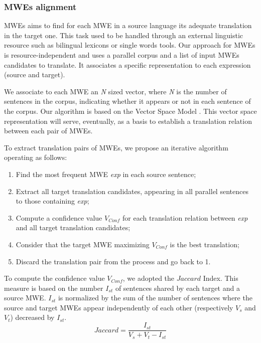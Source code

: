 \documentclass[output=paper,modfonts,nonflat]{langsci/langscibook}
\begin{document}
\subsubsection{MWEs alignment}
MWEs  aims to find for each MWE in a source language its adequate translation in the target one. 
This task used to be handled through an external linguistic resource such as bilingual lexicons or single words  tools. Our approach for MWEs  is resource-independent and uses a parallel corpus and a list of input MWEs candidates to translate. It associates a specific representation to each expression (source and target). 

We associate to each MWE an \textit{N} sized vector, where \textit{N} is the number of sentences in the corpus, indicating whether it appears or not in each sentence of the corpus. 
Our algorithm is based on the Vector Space Model \citep{salton1975vector}.
This vector space representation will serve, eventually, as a basis to establish a translation relation between each pair of MWEs. 
 
To extract translation pairs of MWEs, we propose an iterative  algorithm operating as follows:
\begin{enumerate}
\item Find the most frequent MWE \textit{exp} in each source sentence;
\item Extract all target translation candidates, appearing in all parallel sentences to those containing \textit{exp};
\item Compute a confidence value $V_{Conf}$ for each translation relation between \textit{exp} and all target translation candidates;
\item Consider that the target MWE maximizing $V_{Conf}$ is the best translation;
\item Discard the translation pair from the process and go back to 1.
\end{enumerate}

To compute the confidence value $V_{Conf}$, we adopted the $\mathit{Jaccard}$ Index. %
This measure is based on the number $I_{st}$ of sentences shared by each target and a source MWE. 
$I_{st}$ is normalized by the sum of the number of sentences where the source and target MWEs appear independently of each other (respectively $V_s$ and $V_t$) decreased by $I_{st}$. 
 \begin{equation}
 \label{sem:jaccard}
  \mathit{Jaccard}=\frac{I_{st}}{V_s+V_t-I_{st}}
 \end{equation}
\end{document}
